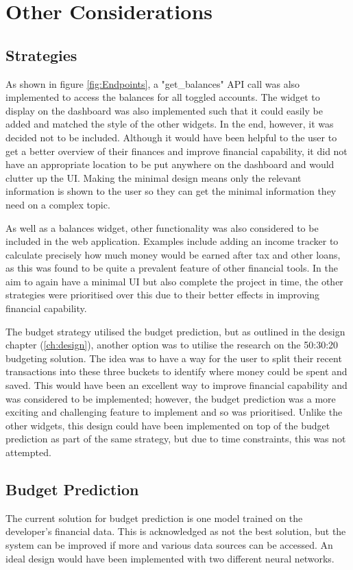 \section{Other Considerations}

\subsection{Strategies}
As shown in figure \ref{fig:Endpoints}, a "get\_balances" API call was also implemented to access the balances for all toggled accounts. The widget to display on the dashboard was also implemented such that it could easily be added and matched the style of the other widgets. In the end, however, it was decided not to be included. Although it would have been helpful to the user to get a better overview of their finances and improve financial capability, it did not have an appropriate location to be put anywhere on the dashboard and would clutter up the UI. Making the minimal design means only the relevant information is shown to the user so they can get the minimal information they need on a complex topic.

As well as a balances widget, other functionality was also considered to be included in the web application. Examples include adding an income tracker to calculate precisely how much money would be earned after tax and other loans, as this was found to be quite a prevalent feature of other financial tools. In the aim to again have a minimal UI but also complete the project in time, the other strategies were prioritised over this due to their better effects in improving financial capability.

The budget strategy utilised the budget prediction, but as outlined in the design chapter (\ref{ch:design}), another option was to utilise the research on the 50:30:20 budgeting solution. The idea was to have a way for the user to split their recent transactions into these three buckets to identify where money could be spent and saved. This would have been an excellent way to improve financial capability and was considered to be implemented; however, the budget prediction was a more exciting and challenging feature to implement and so was prioritised. Unlike the other widgets, this design could have been implemented on top of the budget prediction as part of the same strategy, but due to time constraints, this was not attempted.

\subsection{Budget Prediction}
The current solution for budget prediction is one model trained on the developer's financial data. This is acknowledged as not the best solution, but the system can be improved if more and various data sources can be accessed. An ideal design would have been implemented with two different neural networks.

